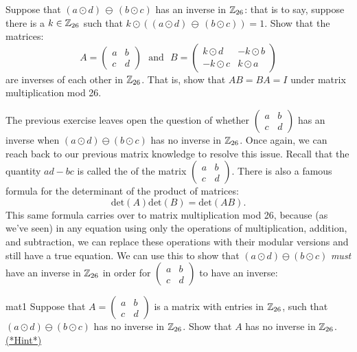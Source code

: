 \begin{exercise}{}
Suppose that $(a \odot d) \, \ominus \, (b \odot c)$ has an inverse in ${\Bbb Z}_{26}$: that is to say, suppose there is a $k \in  {\Bbb Z}_{26}$ such that $k \odot ((a \odot d) \, \ominus \, (b \odot c)) = 1$.  Show that the matrices:
$$
A = \left( \begin{array}{cc} a & b \\ c & d \end{array} \right)~~~\text{and}~~~
B=
\left( \begin{array}{cc}  k \odot d & - k \odot b \\ - k \odot c &  k \odot a \end{array} \right)$$
are inverses of each other  in ${\Bbb Z}_{26}$.  That is, show that $AB = BA = I$ under matrix multiplication mod 26.

\end{exercise} 
The previous exercise leaves open the question of whether $\left( \begin{array}{cc} a & b \\ c & d \end{array} \right)$ has an inverse when $(a \odot d)  \ominus (b \odot c)$ has no inverse in ${\Bbb Z}_{26}$. Once again, we can reach back to our previous matrix knowledge to resolve this issue. Recall that the quantity $ad - bc$ is called the  of the matrix  $\left( \begin{array}{cc} a & b \\ c & d \end{array} \right)$.  There is also a famous formula for the determinant of the product of matrices:
$$\text{det}(A) \text{det}(B) = \text{det}(AB).$$
This same formula carries over to matrix multiplication mod 26, because (as we've seen) in any equation using only the operations of multiplication, addition, and subtraction, we can replace these operations with their modular versions and still have a true equation. We can use this to show that $(a \odot d)  \ominus (b \odot c)$ \emph{must} have an inverse in ${\Bbb Z}_{26}$ in order for $\left( \begin{array}{cc} a & b \\ c & d \end{array} \right)$ to have an inverse:

\begin{exercise}{mat1}
Suppose that $A = \left( \begin{array}{cc} a & b \\ c & d \end{array} \right)$ is a matrix with entries in ${\Bbb Z}_{26}$, such that  $(a \odot d)  \ominus (b \odot c)$ has no inverse in ${\Bbb Z}_{26}$. Show that $A$ has no inverse in  ${\Bbb Z}_{26}$.
\hyperref[sec:Cryptography:Hints]{(*Hint*)}
\end{exercise}


